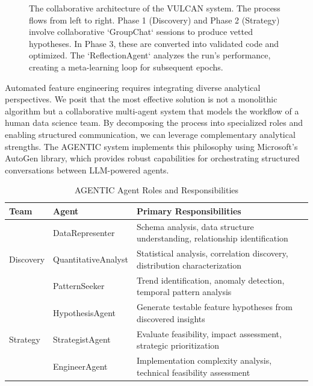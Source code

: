 \begin{figure}[ht!]
    \caption{The collaborative architecture of the VULCAN system. The process flows from left to right. Phase 1 (Discovery) and Phase 2 (Strategy) involve collaborative `GroupChat` sessions to produce vetted hypotheses. In Phase 3, these are converted into validated code and optimized. The `ReflectionAgent` analyzes the run's performance, creating a meta-learning loop for subsequent epochs.}
    \label{fig:vulcan_architecture_final}
\end{figure}

Automated feature engineering requires integrating diverse analytical perspectives. We posit that the most effective solution is not a monolithic algorithm but a collaborative multi-agent system that models the workflow of a human data science team. By decomposing the process into specialized roles and enabling structured communication, we can leverage complementary analytical strengths. The AGENTIC system implements this philosophy using Microsoft's AutoGen library, which provides robust capabilities for orchestrating structured conversations between LLM-powered agents.

\begin{table}[h]
\centering
\caption{AGENTIC Agent Roles and Responsibilities}
\label{tab:agent_roles}
\begin{tabular}{|l|l|p{8cm}|}
\hline
\textbf{Team} & \textbf{Agent} & \textbf{Primary Responsibilities} \\
\hline
\multirow{3}{*}{Discovery} & DataRepresenter & Schema analysis, data structure understanding, relationship identification \\
\cline{2-3}
& QuantitativeAnalyst & Statistical analysis, correlation discovery, distribution characterization \\
\cline{2-3}
& PatternSeeker & Trend identification, anomaly detection, temporal pattern analysis \\
\hline
\multirow{3}{*}{Strategy} & HypothesisAgent & Generate testable feature hypotheses from discovered insights \\
\cline{2-3}
& StrategistAgent & Evaluate feasibility, impact assessment, strategic prioritization \\
\cline{2-3}
& EngineerAgent & Implementation complexity analysis, technical feasibility assessment \\
\hline
\end{tabular}
\end{table}

